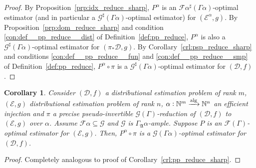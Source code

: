 \documentclass[11pt]{article}
\numberwithin{equation}{section}
\theoremstyle{definition}
\theoremstyle{plain}
\newtheorem{corollary}{Corollary}[section]
\newcommand{\Nats}{\mathbb{N}}
\newcommand{\Dist}{\mathcal{D}}
\newcommand{\GrowA}{\Gamma_{\mathfrak{A}}}
\newcommand{\Fall}{\mathcal{F}}
\newcommand{\EG}{\Fall(\Gamma)}
\newcommand{\Alg}{\xrightarrow{\textnormal{alg}}}
\begin{document}
\begin{proof}

By Proposition~\ref{prp:idx_reduce_sharp}, ${P^\alpha}$ is an ${\Fall \alpha^\sharp(\Gamma \alpha)}$-optimal estimator (and in particular a ${\mathcal{G}^\sharp (\Gamma \alpha)}$-optimal estimator) for ${(\mathcal{E}^\alpha, g)}$. By Proposition~\ref{prp:dom_reduce_sharp} and condition \ref{con:def__pp_reduce__dist} of Definition~\ref{def:pp_reduce}, ${P^\alpha}$ is also a ${\mathcal{G}^\sharp (\Gamma \alpha)}$-optimal estimator for ${(\pi_* \Dist, g)}$. By Corollary~\ref{crl:psp_reduce_sharp} and conditions \ref{con:def__pp_reduce__fun} and \ref{con:def__pp_reduce__smp} of Definition~\ref{def:pp_reduce}, ${P^\alpha \circ \pi}$ is a ${\mathcal{G}^\sharp (\Gamma \alpha)}$-optimal estimator for ${(\Dist, f)}$.
%
\end{proof}

\begin{samepage}
\begin{corollary}

Consider $(\Dist,f)$ a distributional estimation problem of rank ${m}$, $(\mathcal{E},g)$ distributional estimation problem of rank ${n}$, ${\alpha: \Nats^m \Alg \Nats^n}$ an efficient injection and $\pi$ a precise pseudo-invertible $\mathcal{G}(\Gamma)$-reduction of $(\Dist, f)$ to $(\mathcal{E}, g)$ over ${\alpha}$. Assume ${\Fall\alpha \subseteq \mathcal{G}}$ and ${\mathcal{G}}$ is ${\GrowA \alpha}$-ample. Suppose $P$ is an $\EG$-optimal estimator for $(\mathcal{E}, g)$. Then, $P^\alpha \circ \pi$ is a $\mathcal{G} (\Gamma \alpha)$-optimal estimator for $(\Dist, f)$.

\end{corollary}
\end{samepage}

\begin{proof}

Completely analogous to proof of Corollary~\ref{crl:pp_reduce_sharp}.
%
\end{proof}
\end{document}
